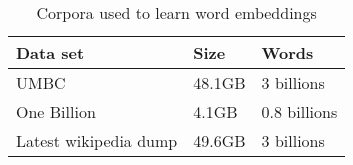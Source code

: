 \begin{table}[h]
\begin{center}
\begin{small}
\begin{tabular}{lll}
\hline
\textbf{Data set} & \textbf{Size} & \textbf{Words} \\ \hline
UMBC 	& 48.1GB & 3 billions \\
One Billion 	& 4.1GB & 0.8 billions  \\
Latest wikipedia dump & 49.6GB & 3 billions \\ \hline
\end{tabular}
\end{small}
\caption{Corpora used to learn word embeddings}
\label{wordEmbedCorpora}
\end{center}
\end{table}
%
%
%
%
%
% 
